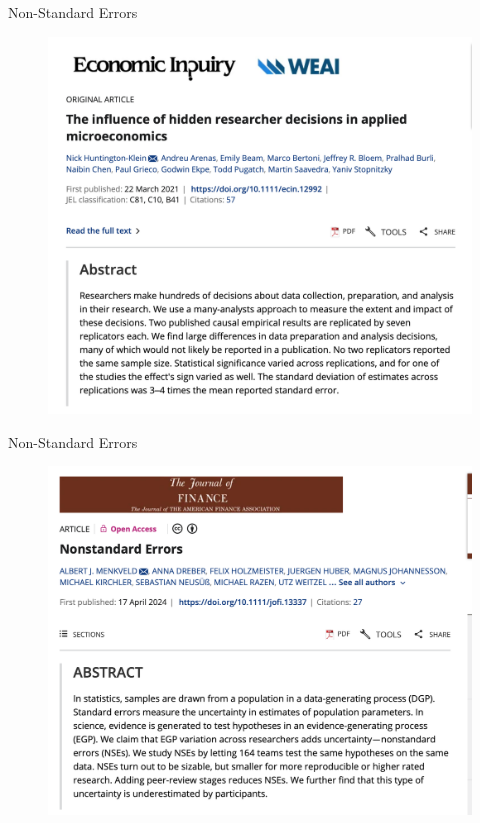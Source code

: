 \documentclass{beamer}
\begin{document}
\begin{frame}{Non-Standard Errors}

\begin{figure}
    \centering
    \includegraphics[height=0.9\textheight]{./lecture_includes/nick_design}
\end{figure}

\end{frame}

 
\begin{frame}{Non-Standard Errors}
 
\begin{figure}
    \centering
    \includegraphics[height=0.9\textheight]{./lecture_includes/nonstandard_errors2}
\end{figure}

\end{frame}
\end{document}
